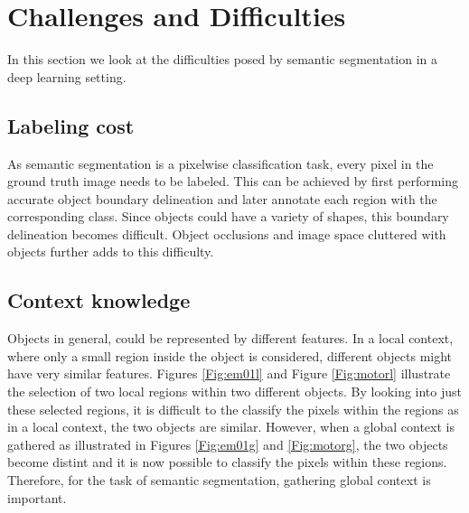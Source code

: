 \section{Challenges and Difficulties}

In this section we look at the difficulties posed by semantic segmentation in a deep learning setting.

\subsection{Labeling cost}

As semantic segmentation is a pixelwise classification task, every pixel in the ground truth image needs to be labeled. This can be achieved by first performing accurate object boundary delineation and later annotate each region with the corresponding class. Since objects could have a variety of shapes, this boundary delineation becomes difficult. Object occlusions and image space cluttered with objects further adds to this difficulty.

\subsection{Context knowledge}

Objects in general, could be represented by different features. In a local context, where only a small region inside the object is considered, different objects might have very similar features. Figures \ref{Fig:em01l} and Figure \ref{Fig:motorl} illustrate the selection of two local regions within two different objects. By looking into just these selected regions, it is difficult to the classify the pixels within the regions as in a local context, the two objects are similar. However, when a global context is gathered as illustrated in Figures \ref{Fig:em01g} and \ref{Fig:motorg}, the two objects become distint and it is now possible to classify the pixels within these regions. Therefore, for the task of semantic segmentation, gathering global context is important. 

